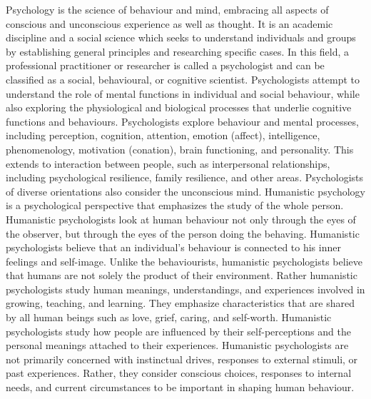 Psychology is the science of behaviour and mind, embracing all aspects of conscious and unconscious experience as well as thought. It is an academic discipline and a social science which seeks to understand individuals and groups by establishing general principles and researching specific cases.
In this field, a professional practitioner or researcher is called a psychologist and can be classified as a social, behavioural, or cognitive scientist. Psychologists attempt to understand the role of mental functions in individual and social behaviour, while also exploring the physiological and biological processes that underlie cognitive functions and behaviours.
Psychologists explore behaviour and mental processes, including perception, cognition, attention, emotion (affect), intelligence, phenomenology, motivation (conation), brain functioning, and personality. This extends to interaction between people, such as interpersonal relationships, including psychological resilience, family resilience, and other areas. Psychologists of diverse orientations also consider the unconscious mind.
Humanistic psychology is a psychological perspective that emphasizes the study of the whole person. Humanistic psychologists look at human behaviour not only through the eyes of the observer, but through the eyes of the person doing the behaving. Humanistic psychologists believe that an individual's behaviour is connected to his inner feelings and self-image.
Unlike the behaviourists, humanistic psychologists believe that humans are not solely the product of their environment. Rather humanistic psychologists study human meanings, understandings, and experiences involved in growing, teaching, and learning. They emphasize characteristics that are shared by all human beings such as love, grief, caring, and self-worth.
Humanistic psychologists study how people are influenced by their self-perceptions and the personal meanings attached to their experiences. Humanistic psychologists are not primarily concerned with instinctual drives, responses to external stimuli, or past experiences. Rather, they consider conscious choices, responses to internal needs, and current circumstances to be important in shaping human behaviour.
